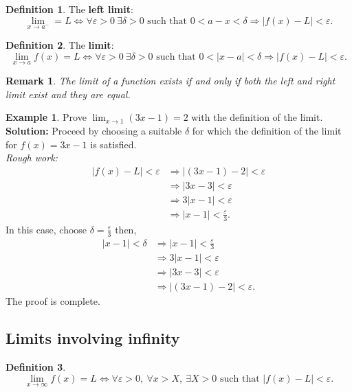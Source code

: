 \documentclass[12pt, a4paper]{article}
\newcommand{\f}[2]{\frac{#1}{#2}}
\newcommand{\imply}{\Rightarrow}
\newtheorem*{remark}{Remark}
\theoremstyle{definition}
\newtheorem{definition}{Definition}[section]
\newtheorem*{example}{Example}
\theoremstyle{plain}
\begin{document}
\begin{definition}
The \textbf{left limit}: $$\lim_{x \to a^-} = L \iff \forall \varepsilon>0 \ \exists \delta>0 \text{ such that } 0<a-x<\delta \Rightarrow|f(x)-L|<\varepsilon.$$
\end{definition}

\begin{definition}
The \textbf{limit}: $$\lim_{x \to a} f(x) = L \iff  \forall \varepsilon>0 \ \exists \delta>0 \text{ such that } 0<|x-a|<\delta \Rightarrow |f(x)-L|<\varepsilon.$$ 
\end{definition}

\begin{remark}
The limit of a function exists if and only if both the left and right limit exist and they are equal.
\end{remark}

\begin{example}
Prove $\lim_{x\to 1} (3x-1)=2$ with the definition of the limit. \\
\textbf{Solution:} Proceed by choosing a suitable $\delta$ for which the definition of the limit for $f(x)=3x-1$ is satisfied. \\
\textit{Rough work:} $$\begin{aligned}
|f(x)-L|<\varepsilon &\imply |(3x-1)-2| < \varepsilon \\
					&\imply |3x-3|<\varepsilon \\
					&\imply 3|x-1|<\varepsilon \\
					&\imply |x-1|< \f{\varepsilon}{3}.
\end{aligned}$$ In this case, choose $\delta=\f{\varepsilon}{3}$ then, $$\begin{aligned}
|x-1|<\delta 	&\imply |x-1|< \f{\varepsilon}{3} \\
				&\imply 3|x-1|<\varepsilon \\
				&\imply |3x-3|<\varepsilon \\
				&\imply |(3x-1)-2|<\varepsilon.
\end{aligned}$$ The proof is complete.
\end{example}

\subsection{Limits involving infinity}

\begin{definition}
$$\lim_{x \to \infty} f(x) = L \iff \forall \varepsilon>0, \ \forall x>X, \ \exists X>0 \text{ such that } |f(x)-L|<\varepsilon.$$
\end{definition}
\end{document}
